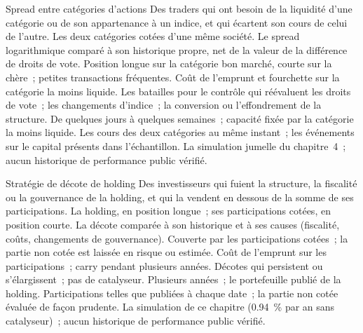 \begin{strategyfile}{Spread entre catégories d'actions}\label{strat:s1:share-classes-holding-companies-closed-end-funds-spacs:class}
 Des traders qui ont besoin de la liquidité d'une catégorie ou de son appartenance à un indice, et qui écartent son cours de celui de l'autre.
 Les deux catégories cotées d'une même société.
 Le spread logarithmique comparé à son historique propre, net de la valeur de la différence de droits de vote.
 Position longue sur la catégorie bon marché, courte sur la chère~; petites transactions fréquentes.
 Coût de l'emprunt et fourchette sur la catégorie la moins liquide.
 Les batailles pour le contrôle qui réévaluent les droits de vote~; les changements d'indice~; la conversion ou l'effondrement de la structure.
 De quelques jours à quelques semaines~; capacité fixée par la catégorie la moins liquide.
 Les cours des deux catégories au même instant~; les événements sur le capital présents dans l'échantillon.
 La simulation jumelle du chapitre~4~; aucun historique de performance public vérifié.
\end{strategyfile}

\begin{strategyfile}{Stratégie de décote de holding}\label{strat:s1:share-classes-holding-companies-closed-end-funds-spacs:holding}
 Des investisseurs qui fuient la structure, la fiscalité ou la gouvernance de la holding, et qui la vendent en dessous de la somme de ses participations.
 La holding, en position longue~; ses participations cotées, en position courte.
 La décote comparée à son historique et à ses causes (fiscalité, coûts, changements de gouvernance).
 Couverte par les participations cotées~; la partie non cotée est laissée en risque ou estimée.
 Coût de l'emprunt sur les participations~; carry pendant plusieurs années.
 Décotes qui persistent ou s'élargissent~; pas de catalyseur.
 Plusieurs années~; le portefeuille publié de la holding.
 Participations telles que publiées à chaque date~; la partie non cotée évaluée de façon prudente.
 La simulation de ce chapitre (0.94~\% par an sans catalyseur)~; aucun historique de performance public vérifié.
\end{strategyfile}

